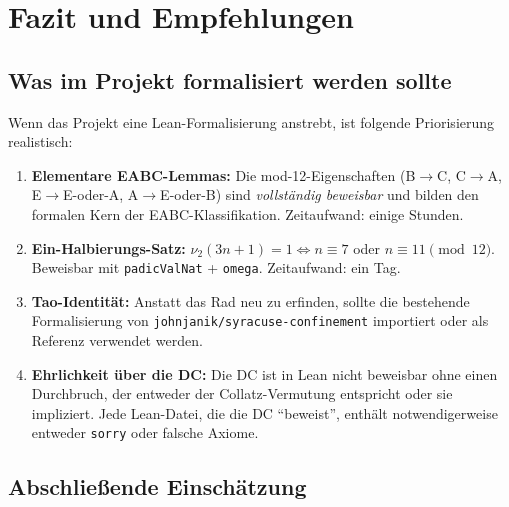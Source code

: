 \documentclass[12pt,a4paper]{article}
\newcommand{\vii}{\nu_2}
\begin{document}
\section{Fazit und Empfehlungen}
\label{sec:fazit}

\subsection{Was im Projekt formalisiert werden sollte}

Wenn das Projekt eine Lean-Formalisierung anstrebt, ist folgende
Priorisierung realistisch:

\begin{enumerate}[label=\textbf{Priorität~\arabic*:}]
  \item \textbf{Elementare EABC-Lemmas:}
    Die mod-12-Eigenschaften (B$\to$C, C$\to$A, E$\to$E-oder-A,
    A$\to$E-oder-B) sind \emph{vollständig beweisbar} und bilden
    den formalen Kern der EABC-Klassifikation.
    Zeitaufwand: einige Stunden.

  \item \textbf{Ein-Halbierungs-Satz:}
    $\vii(3n+1) = 1 \Leftrightarrow n \equiv 7$ oder $n \equiv 11 \pmod{12}$.
    Beweisbar mit \lstinline|padicValNat| + \lstinline|omega|.
    Zeitaufwand: ein Tag.

  \item \textbf{Tao-Identität:}
    Anstatt das Rad neu zu erfinden, sollte die bestehende
    Formalisierung von \texttt{johnjanik/syracuse-confinement}
    importiert oder als Referenz verwendet werden.

  \item \textbf{Ehrlichkeit über die DC:}
    Die DC ist in Lean nicht beweisbar ohne einen Durchbruch,
    der entweder der Collatz-Vermutung entspricht oder sie impliziert.
    Jede Lean-Datei, die die DC ``beweist'', enthält notwendigerweise
    entweder \lstinline|sorry| oder falsche Axiome.
\end{enumerate}

\subsection{Abschließende Einschätzung}
\end{document}

